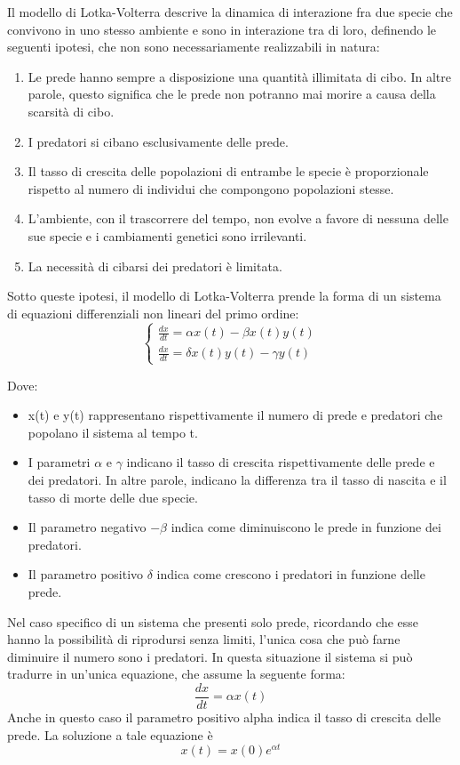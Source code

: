 \documentclass[11pt]{article}
\begin{document}
Il modello di Lotka-Volterra\cite{Artioli} descrive la dinamica di interazione fra due specie che convivono in uno stesso ambiente e sono in interazione tra di loro, definendo le seguenti ipotesi, che non sono necessariamente realizzabili in natura: 
\begin{enumerate}
    \item Le prede hanno sempre a disposizione una quantità illimitata di cibo. In altre parole, questo significa che le prede non potranno mai morire a causa della scarsità di cibo. 
    \item I predatori si cibano esclusivamente delle prede. 
    \item Il tasso di crescita delle popolazioni di entrambe le specie è proporzionale rispetto al numero di individui che compongono popolazioni stesse.
    \item L'ambiente, con il trascorrere del tempo, non evolve a favore di nessuna delle sue specie e i cambiamenti genetici sono irrilevanti. 
    \item La necessità di cibarsi dei predatori è limitata. 
\end{enumerate}

Sotto queste ipotesi, il modello di Lotka-Volterra prende la forma di un sistema di equazioni differenziali non lineari del primo ordine:
\[
\label{eqn:modelloGenerale}
\left\{
\begin{array}{cc}
\frac{dx}{dt}=\alpha x(t) - \beta x(t)y(t)\\
\frac{dx}{dt}=\delta x(t)y(t) - \gamma y(t)
\end{array}
\right.
\]

Dove: 
\begin{itemize}
    \item x(t) e y(t) rappresentano rispettivamente il numero di prede e predatori che popolano il sistema al tempo t.
    \item I parametri $\alpha$ e $\gamma$ indicano il tasso di crescita rispettivamente delle prede e dei predatori. In altre parole, indicano la differenza tra il tasso di nascita e il tasso di morte delle due specie.
    \item Il parametro negativo $-\beta$ indica come diminuiscono le prede in funzione dei predatori.
    \item Il parametro positivo $\delta$ indica come crescono i predatori in funzione delle prede. 
\end{itemize}

\noindent Nel caso specifico di un sistema che presenti solo prede, ricordando che esse hanno la possibilità di riprodursi senza limiti, l'unica cosa che può farne diminuire il numero sono i predatori.  
In questa situazione il sistema si può tradurre in un'unica equazione, che assume la seguente forma: 
\[
    \frac{dx}{dt} = \alpha x(t) 
\]
Anche in questo caso il parametro positivo alpha indica il tasso di crescita delle prede. 
La soluzione a tale equazione è 
\begin{equation}\label{eqn:soloPrede}
    x(t) = x(0)e^{\alpha t}
\end{equation}
\end{document}
